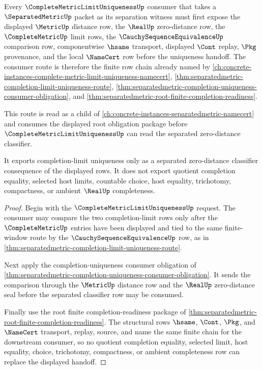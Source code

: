 \begin{theorem}
\label{thm:separated-metric-complete-limit-route}
Every $\CompleteMetricLimitUniquenessUp$ consumer that takes a $\SeparatedMetricUp$ packet as its separation witness must first expose the displayed $\MetricUp$ distance row, the $\RealUp$ zero-distance row, the $\CompleteMetricUp$ limit rows, the $\CauchySequenceEquivalenceUp$ comparison row, componentwise $\hsame$ transport, displayed $\Cont$ replay, $\Pkg$ provenance, and the local $\NameCert$ row before the uniqueness handoff. The consumer route is therefore the finite row chain already named by \autoref{ch:concrete-instances-complete-metric-limit-uniqueness-namecert}, \autoref{thm:separatedmetric-completion-limit-uniqueness-route}, \autoref{thm:separatedmetric-completion-uniqueness-consumer-obligation}, and \autoref{thm:separatedmetric-root-finite-completion-readiness}.

This route is read as a child of \autoref{ch:concrete-instances-separatedmetric-namecert} and consumes the displayed root obligation package before $\CompleteMetricLimitUniquenessUp$ can read the separated zero-distance classifier.

It exports completion-limit uniqueness only as a separated zero-distance classifier consequence of the displayed rows. It does not export quotient completion equality, selected host limits, countable choice, host equality, trichotomy, compactness, or ambient $\RealUp$ completeness.
\end{theorem}
\begin{proof}
Begin with the $\CompleteMetricLimitUniquenessUp$ request. The consumer may compare the two completion-limit rows only after the $\CompleteMetricUp$ entries have been displayed and tied to the same finite-window route by the $\CauchySequenceEquivalenceUp$ row, as in \autoref{thm:separatedmetric-completion-limit-uniqueness-route}.

Next apply the completion-uniqueness consumer obligation of \autoref{thm:separatedmetric-completion-uniqueness-consumer-obligation}. It sends the comparison through the $\MetricUp$ distance row and the $\RealUp$ zero-distance seal before the separated classifier row may be consumed.

Finally use the root finite completion-readiness package of \autoref{thm:separatedmetric-root-finite-completion-readiness}. The structural rows $\hsame$, $\Cont$, $\Pkg$, and $\NameCert$ transport, replay, source, and name the same finite chain for the downstream consumer, so no quotient completion equality, selected limit, host equality, choice, trichotomy, compactness, or ambient completeness row can replace the displayed handoff.
\end{proof}
